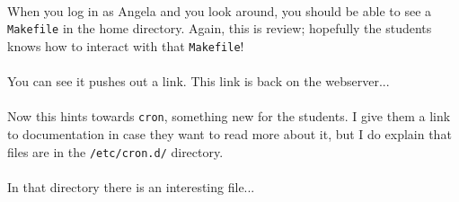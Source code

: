 \documentclass[11pt]{article}
\begin{document}
	\newpage

	\paragraph{} When you log in as Angela and you look around, you should be able to see a \texttt{Makefile} in the home directory. Again, this is review; hopefully the students knows how to interact with that \texttt{Makefile}!

	\begin{center}
		\graphicspath{ {.} }
		\centering
	\end{center}


	\paragraph{} You can see it pushes out a link. This link is back on the webserver... \\

	\begin{center}
		\graphicspath{ {.} }
		\centering
	\end{center}

	\paragraph{} Now this hints towards \texttt{cron}, something new for the students. I give them a link to documentation in case they want to read more about it, but I do explain that files are in the \texttt{/etc/cron.d/} directory.

	\paragraph{} In that directory there is an interesting file...

	\begin{center}
		\graphicspath{ {.} }
		\centering
	\end{center}
\end{document}
